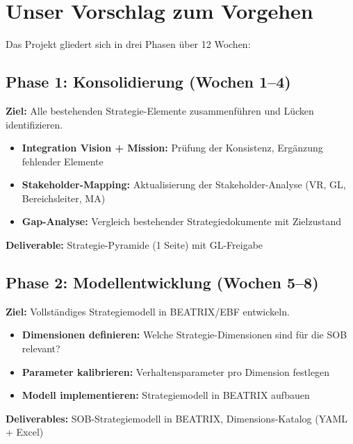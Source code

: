 \documentclass{fehradvice-report}
\begin{document}
\newpage
\section{Unser Vorschlag zum Vorgehen}

Das Projekt gliedert sich in drei Phasen über 12 Wochen:

\subsection{Phase 1: Konsolidierung (Wochen 1--4)}

\textbf{Ziel:} Alle bestehenden Strategie-Elemente zusammenführen und Lücken identifizieren.

\begin{itemize}
    \item \textbf{Integration Vision + Mission:} Prüfung der Konsistenz, Ergänzung fehlender Elemente
    \item \textbf{Stakeholder-Mapping:} Aktualisierung der Stakeholder-Analyse (VR, GL, Bereichsleiter, MA)
    \item \textbf{Gap-Analyse:} Vergleich bestehender Strategiedokumente mit Zielzustand
\end{itemize}

\textbf{Deliverable:} Strategie-Pyramide (1 Seite) mit GL-Freigabe

\subsection{Phase 2: Modellentwicklung (Wochen 5--8)}

\textbf{Ziel:} Vollständiges Strategiemodell in BEATRIX/EBF entwickeln.

\begin{itemize}
    \item \textbf{Dimensionen definieren:} Welche Strategie-Dimensionen sind für die SOB relevant?
    \item \textbf{Parameter kalibrieren:} Verhaltensparameter pro Dimension festlegen
    \item \textbf{Modell implementieren:} Strategiemodell in BEATRIX aufbauen
\end{itemize}

\textbf{Deliverables:} SOB-Strategiemodell in BEATRIX, Dimensions-Katalog (YAML + Excel)
\end{document}
